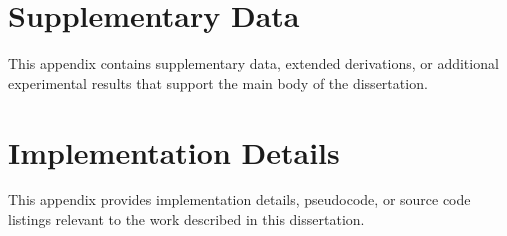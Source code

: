 \chapter{Supplementary Data}
\label{app:data}

This appendix contains supplementary data, extended derivations, or
additional experimental results that support the main body of the
dissertation.

\chapter{Implementation Details}
\label{app:code}

This appendix provides implementation details, pseudocode, or source
code listings relevant to the work described in this dissertation.
